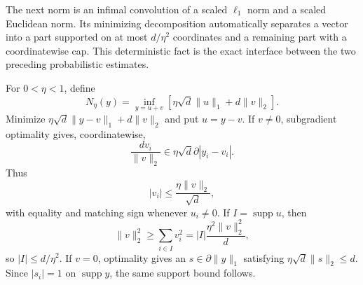 \documentclass[11pt]{article}
\numberwithin{equation}{section}
\theoremstyle{definition}
\theoremstyle{remark}
\newcommand{\1}{\boldsymbol 1}
\begin{document}
\begin{aiblock}
The next norm is an infimal convolution of a scaled
$\ell_1$ norm and a scaled Euclidean norm. Its minimizing
decomposition automatically separates a vector into a part
supported on at most $d/\eta^2$ coordinates and a remaining
part with a coordinatewise cap. This deterministic fact is
the exact interface between the two preceding
probabilistic estimates.

For $0<\eta<1$, define
\[
  N_\eta(y)=\inf_{y=u+v} \left[\eta\sqrt d\|u\|_1+d\|v\|_2
  \right].
\]
Minimize $\eta\sqrt d\|y-v\|_1+d\|v\|_2$ and put $u=y-v$.
If $v\ne0$, subgradient optimality gives, coordinatewise,
\[
  \frac{dv_i}{\|v\|_2}\in\eta\sqrt d\partial|y_i-v_i|.
\]
Thus
\[
  |v_i|\le\frac{\eta\|v\|_2}{\sqrt d},
\]
with equality and matching sign whenever $u_i\ne0$. If
$I=\operatorname{supp}u$, then
\[
  \|v\|_2^2\ge\sum_{i\in I}v_i^2=|I|\frac{\eta^2\|v\|_2^2}{d},
\]
so $|I|\le d/\eta^2$. If $v=0$, optimality gives an
$s\in\partial\|y\|_1$ satisfying $\eta\sqrt d\|s\|_2\le
d$. Since $|s_i|=1$ on $\operatorname{supp}y$, the same
support bound follows.
\end{aiblock}
\end{document}

